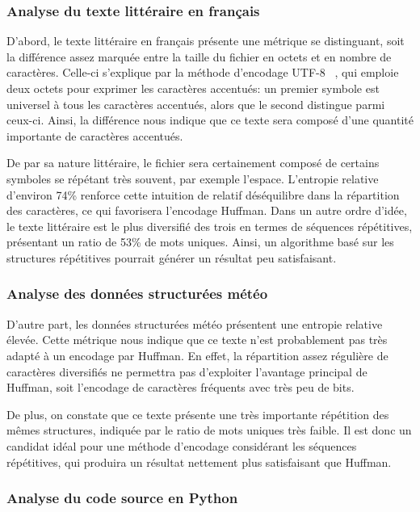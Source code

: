 \documentclass[12pt,letterpaper]{article}
\begin{document}
\subsubsection*{Analyse du texte littéraire en français}

D'abord, le texte littéraire en français présente une métrique se distinguant, soit la différence assez marquée entre la taille du fichier en octets et en nombre de caractères.
Celle-ci s'explique par la méthode d'encodage UTF-8 ~\cite{rfc3629}, qui emploie deux octets pour exprimer les caractères accentués: un premier symbole est universel à tous les caractères accentués, alors que le second distingue parmi ceux-ci.
Ainsi, la différence nous indique que ce texte sera composé d'une quantité importante de caractères accentués. 

De par sa nature littéraire, le fichier sera certainement composé de certains symboles se répétant très souvent, par exemple l'espace.
L'entropie relative d'environ 74\% renforce cette intuition de relatif déséquilibre dans la répartition des caractères, ce qui favorisera l'encodage Huffman.
Dans un autre ordre d'idée, le texte littéraire est le plus diversifié des trois en termes de séquences répétitives, présentant un ratio de 53\% de mots uniques.
Ainsi, un algorithme basé sur les structures répétitives pourrait générer un résultat peu satisfaisant.

\subsubsection*{Analyse des données structurées météo}

D'autre part, les données structurées météo présentent une entropie relative élevée. 
Cette métrique nous indique que ce texte n'est probablement pas très adapté à un encodage par Huffman.
En effet, la répartition assez régulière de caractères diversifiés ne permettra pas d'exploiter l'avantage principal de Huffman, soit l'encodage de caractères fréquents avec très peu de bits. 

De plus, on constate que ce texte présente une très importante répétition des mêmes structures, indiquée par le ratio de mots uniques très faible.
Il est donc un candidat idéal pour une méthode d'encodage considérant les séquences répétitives, qui produira un résultat nettement plus satisfaisant que Huffman.

\subsubsection*{Analyse du code source en Python}
\end{document}
